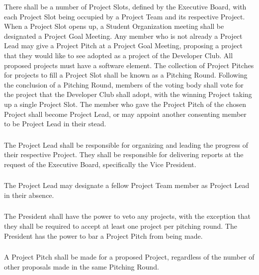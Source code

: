 \documentclass{article}
\newcommand{\clubName}{Developer Club\xspace}
\newcommand{\votingBody}{voting body\xspace}
\newcommand{\officersGroup}{Executive Board\xspace}
\newcommand{\meeting}{Student Organization meeting\xspace}
\let\subsection\subsubsection
\begin{document}
There shall be a number of Project Slots, defined by the \officersGroup, with each Project Slot being occupied by a Project Team and its respective Project. When a Project Slot opens up, a \meeting shall be designated a Project Goal Meeting. Any member who is not already a Project Lead may give a Project Pitch at a Project Goal Meeting, proposing a project that they would like to see adopted as a project of the \clubName. All proposed projects must have a software element. The collection of Project Pitches for projects to fill a Project Slot shall be known as a Pitching Round. Following the conclusion of a Pitching Round, members of the \votingBody shall vote for the project that the \clubName shall adopt, with the winning Project taking up a single Project Slot. The member who gave the Project Pitch of the chosen Project shall become Project Lead, or may appoint another consenting member to be Project Lead in their stead.

\subsection{} The Project Lead shall be responsible for organizing and leading the progress of their respective Project. They shall be responsible for delivering reports at the request of the \officersGroup, specifically the Vice President.

\subsection{} 

The Project Lead may designate a fellow Project Team member as Project Lead in their absence.

\subsection{}

The President shall have the power to veto any projects, with the exception that they shall be required to accept at least one project per pitching round. The President has the power to bar a Project Pitch from being made.

\subsection{}

A Project Pitch shall be made for a proposed Project, regardless of the number of other proposals made in the same Pitching Round.
\end{document}
